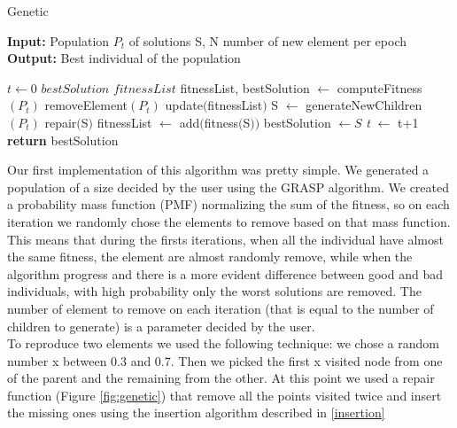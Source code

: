 \begin{algorithm}
	\caption{Genetic}\label{Genetic method}
	\hspace*{\algorithmicindent} \textbf{Input:} Population $P_t$ of solutions S, N number of new element per epoch \\
	\hspace*{\algorithmicindent} \textbf{Output:} Best individual of the population
    \begin{algorithmic}[1]
    		\State $\textit{t} \leftarrow 0$
    		\State $\textit{bestSolution}$
    		\State $\textit{fitnessList}$
    		\State fitnessList, bestSolution $\leftarrow$ computeFitness$(P_t)$ 
    				\State removeElement$(P_t)$
    				\State update$($fitnessList$)$
    			\EndFor
    				\State S $\leftarrow$ generateNewChildren$(P_t)$
    				\State repair$($S$)$
    				\State fitnessList $\leftarrow$ add$($fitness$($S$))$
    					\State bestSolution $\leftarrow S$
    				\EndIf
    			\EndFor
    			\State \textit{t} $\leftarrow$ t+1
    		\EndWhile
    		\State \textbf{return} bestSolution 
    \end{algorithmic}
\end{algorithm}


\noindent Our first implementation of this algorithm was pretty simple. We generated a population of a size decided by the user using the GRASP algorithm. We created a probability mass function (PMF) normalizing the sum of the fitness, so on each iteration we randomly chose the elements to remove based on that mass function. This means that during the firsts iterations, when all the individual have almost the same fitness, the element are almost randomly remove, while when the algorithm progress and there is a more evident difference between good and bad individuals, with high probability only the worst solutions are removed. The number of element to remove on each iteration (that is equal to the number of children to generate) is a parameter decided by the user. \\
To reproduce two elements we used the following technique: we chose a random number x between 0.3 and 0.7. Then we picked the first x visited node from one of the parent and the remaining from the other. At this point we used a repair function (Figure \ref{fig:genetic}) that remove all the points visited twice and insert the missing ones using the insertion algorithm described in \ref{insertion} 

